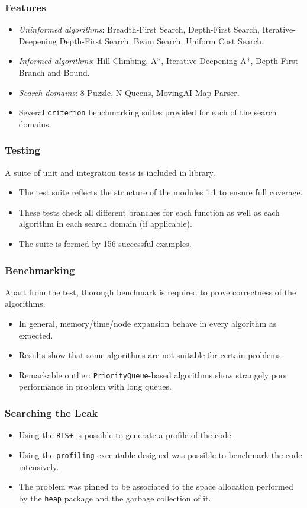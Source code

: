 \documentclass{beamer}
\begin{document}
\begin{frame}
  \frametitle{Features}
  \begin{itemize}
  \item \emph{Uninformed algorithms}: Breadth-First Search, Depth-First Search,
    Iterative-Deepening Depth-First Search, Beam Search, Uniform Cost Search.
  \item \emph{Informed algorithms}: Hill-Climbing, A*, Iterative-Deepening A*,
    Depth-First Branch and Bound.
  \item \emph{Search domains}: 8-Puzzle, N-Queens, MovingAI Map Parser.
  \item Several \texttt{criterion} benchmarking suites provided for each of the
    search domains.
  \end{itemize}
\end{frame}

\begin{frame}
  \frametitle{Testing}
  A suite of unit and integration tests is included in library.
  \begin{itemize}
  \item The test suite reflects the structure of the modules 1:1 to ensure full
    coverage.
  \item These tests check all different branches for each function as well as
    each algorithm in each search domain (if applicable).
  \item The suite is formed by 156 successful examples.
  \end{itemize}
\end{frame}

\begin{frame}
  \frametitle{Benchmarking}
  Apart from the test, thorough benchmark is required to prove correctness of
  the algorithms.
  \begin{itemize}
  \item In general, memory/time/node expansion behave in every algorithm as
    expected.
  \item Results show that some algorithms are not suitable for certain
    problems.
  \item Remarkable outlier: \texttt{PriorityQueue}-based algorithms show
    strangely poor performance in problem with long queues.
  \end{itemize}
\end{frame}

\begin{frame}
  \frametitle{Searching the Leak}
  \begin{itemize}
  \item Using the \texttt{RTS+} is possible to generate a profile of the code.
  \item Using the \texttt{profiling} executable designed was possible to
    benchmark the code intensively.
  \item The problem was pinned to be associated to the space allocation
    performed by the \texttt{heap} package and the garbage collection of it.
  \end{itemize}
\end{frame}
\end{document}
